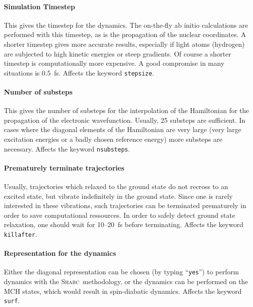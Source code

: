 \documentclass[a4paper,11pt,DIV=15,openany,twoside=false]{scrbook}
\newcommand{\sharc}{\textsc{Sharc}}
\newcommand{\ttt}[1]{\texttt{#1}}
\begin{document}
\paragraph{Simulation Timestep}

This gives the timestep for the dynamics. The on-the-fly ab initio calculations are performed with this timestep, as is the propagation of the nuclear coordinates. A shorter timestep gives more accurate results, especially if light atoms (hydrogen) are subjected to high kinetic energies or steep gradients. Of course a shorter timestep is computationally more expensive. A good compromise in many situations is 0.5~fs. Affects the keyword \ttt{stepsize}.

\paragraph{Number of substeps}

This gives the number of substeps for the interpolation of the Hamiltonian for the propagation of the electronic wavefunction. Usually, 25 substeps are sufficient. In cases where the diagonal elements of the Hamiltonian are very large (very large excitation energies or a badly chosen reference energy) more substeps are necessary. Affects the keyword \ttt{nsubsteps}.

\paragraph{Prematurely terminate trajectories}

Usually, trajectories which relaxed to the ground state do not recross to an excited state, but vibrate indefinitely in the ground state. Since one is rarely interested in these vibrations, such trajectories can be terminated prematurely in order to save computational ressources. In order to safely detect ground state relaxation, one should wait for 10--20~fs before terminating. Affects the keyword \ttt{killafter}.

\paragraph{Representation for the dynamics}

Either the diagonal representation can be chosen (by typing ``\ttt{yes}'') to perform dynamics with the \sharc\ methodology, or the dynamics can be performed on the MCH states, which would result in spin-diabatic dynamics. Affects the keyword \ttt{surf}.
\end{document}
